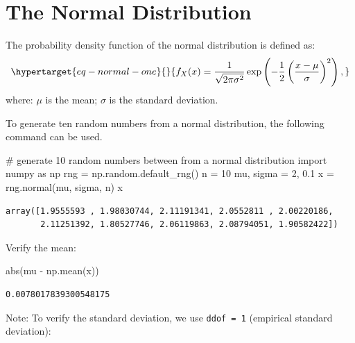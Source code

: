 \documentclass[
  letterpaper,
  DIV=11,
  numbers=noendperiod]{scrreprt}
\newenvironment{Shaded}{\begin{snugshade}}{\end{snugshade}}
\newcommand{\BuiltInTok}[1]{\textcolor[rgb]{0.00,0.23,0.31}{#1}}
\newcommand{\CommentTok}[1]{\textcolor[rgb]{0.37,0.37,0.37}{#1}}
\newcommand{\DecValTok}[1]{\textcolor[rgb]{0.68,0.00,0.00}{#1}}
\newcommand{\FloatTok}[1]{\textcolor[rgb]{0.68,0.00,0.00}{#1}}
\newcommand{\ImportTok}[1]{\textcolor[rgb]{0.00,0.46,0.62}{#1}}
\newcommand{\NormalTok}[1]{\textcolor[rgb]{0.00,0.23,0.31}{#1}}
\newcommand{\OperatorTok}[1]{\textcolor[rgb]{0.37,0.37,0.37}{#1}}
\begin{document}
\hypertarget{the-normal-distribution}{%
\section{The Normal Distribution}\label{the-normal-distribution}}

The probability density function of the normal distribution is defined
as: \begin{equation}\protect\hypertarget{eq-normal-one}{}{
f_X(x) = \frac{1}{\sqrt{2\pi \sigma^2}} \exp\left(-\frac{1}{2} \left(\frac{x-\mu}{\sigma}\right)^2\right),
}\label{eq-normal-one}\end{equation} where: \(\mu\) is the mean;
\(\sigma\) is the standard deviation.

To generate ten random numbers from a normal distribution, the following
command can be used.

\begin{Shaded}
\begin{Highlighting}[]
\CommentTok{\# generate 10 random numbers between from a normal distribution}
\ImportTok{import}\NormalTok{ numpy }\ImportTok{as}\NormalTok{ np}
\NormalTok{rng }\OperatorTok{=}\NormalTok{ np.random.default\_rng()}
\NormalTok{n }\OperatorTok{=} \DecValTok{10}
\NormalTok{mu, sigma }\OperatorTok{=} \DecValTok{2}\NormalTok{, }\FloatTok{0.1}
\NormalTok{x }\OperatorTok{=}\NormalTok{ rng.normal(mu, sigma, n)}
\NormalTok{x}
\end{Highlighting}
\end{Shaded}

\begin{verbatim}
array([1.9555593 , 1.98030744, 2.11191341, 2.0552811 , 2.00220186,
       2.11251392, 1.80527746, 2.06119863, 2.08794051, 1.90582422])
\end{verbatim}

Verify the mean:

\begin{Shaded}
\begin{Highlighting}[]
\BuiltInTok{abs}\NormalTok{(mu }\OperatorTok{{-}}\NormalTok{ np.mean(x))}
\end{Highlighting}
\end{Shaded}

\begin{verbatim}
0.0078017839300548175
\end{verbatim}

Note: To verify the standard deviation, we use \texttt{ddof\ =\ 1}
(empirical standard deviation):
\end{document}
